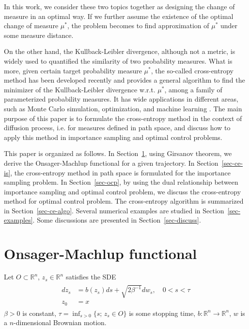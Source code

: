 \documentclass[final]{siamltex}
\begin{document}
In this work, we consider these two topics together as designing the change of
measure in an optimal way. If we further assume the existence of the optimal
change of measure $\mu^*$, the problem becomes to find approximation of
$\mu^*$ under some measure distance.

On the other hand, the Kullback-Leibler divergence, although not a metric, is
widely used to quantified the similarity of two probability measures. 
What is more, given certain target probability measure $\mu^*$, the so-called cross-entropy method has been
developed recently and provides a general algorithm to find the minimizer of the
Kullback-Leibler divergence w.r.t. $\mu^*$, among a family of parameterized
probability measures. It has wide applications in different areas, such as
Monte Carlo simulation, optimization, and machine learning \cite{ce_book}. The
main purpose of this paper is to formulate the cross-entropy method in the
context of diffusion process, i.e. for measures defined in path space, and
discuss how to apply this method in importance sampling and optimal control
problems.

This paper is organized as follows. In Section~\ref{sec-om-functional},
using Girsanov theorem, we derive the Onsager-Machlup functional for a given trajectory.
In Section~\ref{sec-ce-is}, the cross-entropy method in path space is
formulated for the importance sampling problem.
In Section~\ref{sec-ocp}, by using the dual relationship between importance
sampling and optimal control problem, we discuss the cross-entropy method for
optimal control problem. The cross-entropy algorithm is summarized in
Section~\ref{sec-ce-algo}. Several numerical examples are studied in
Section~\ref{sec-examples}. Some discussions are presented in
Section~\ref{sec-discuss}.


\section{Onsager-Machlup functional}
\label{sec-om-functional}
Let $O \subset \mathbb{R}^n$, $z_s \in \mathbb{R}^n$ satisfies the SDE 
\begin{align}
\begin{split}
  d z_s &= b(z_s) ds + \sqrt{2\beta^{-1}} dw_s, \quad 0 < s < \tau  \\
  z_0&=x
  \end{split}
\label{dynamics-1}
\end{align}
$\beta >0$ is constant, $\tau = \inf_{s>0} \{s;\, z_s \in O\}$ is some
stopping time, $b : \mathbb{R}^n \rightarrow \mathbb{R}^n$, $w$ is a
$n$-dimensional Brownian motion. 
\end{document}
